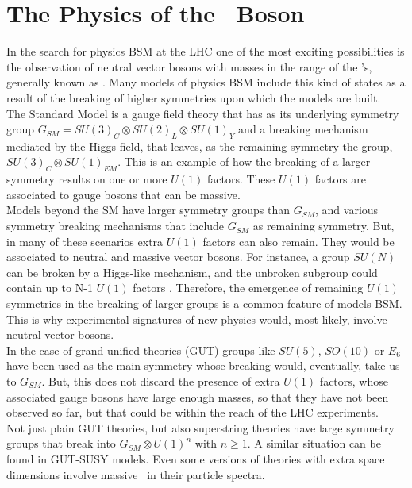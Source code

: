 \chapter[The Physics of The \Zprime~Boson]{The Physics of the \Zprime~Boson}
\label{chap:Zp}

\noindent In the search for physics BSM at the LHC one of the most exciting possibilities 
is the observation of neutral vector bosons with masses in the range of 
the \TeV's, generally known as \Zprime. Many models of physics 
BSM include this kind of states as a result of the breaking of higher symmetries upon 
which the models are built. \\

\noindent The Standard Model is a gauge field theory that has as its underlying symmetry 
group $G_{SM} = SU(3)_{C}\otimes SU(2)_{L} \otimes SU(1)_{Y}$ and a breaking mechanism 
mediated by the Higgs field, that leaves, as the remaining symmetry the group,
$SU(3)_{C}\otimes SU(1)_{EM}$. This is an example of how the breaking of a larger symmetry 
results on one or more $U(1)$ factors. These $U(1)$ factors are associated to gauge
bosons that can be massive.\\

\noindent Models beyond the SM have larger symmetry groups than $G_{SM}$, and various symmetry breaking 
mechanisms that include $G_{SM}$ as remaining symmetry. But, in many of these 
scenarios extra $U(1)$ factors can also remain. They would be associated 
to neutral and massive vector bosons. For instance, a group $SU(N)$ can 
be broken by a Higgs-like mechanism, and the unbroken subgroup could contain up to
N-1 $U(1)$ factors \cite{Langacker:2008yv}. Therefore, the emergence of remaining 
$U(1)$ symmetries in the breaking of larger groups is a common feature 
of models BSM. This is why experimental signatures of new physics 
would, most likely, involve neutral vector bosons.\\
% 
\noindent In the case of grand unified theories (GUT) groups like $SU(5)$, $SO(10)$ or $E_{6}$ have been
used as the main symmetry whose breaking would, eventually, take us to $G_{SM}$. But, this
does not discard the presence of extra $U(1)$ factors, whose associated 
gauge bosons have large enough masses, so that they have not 
been observed so far, but that could be within the reach of the LHC 
experiments. \\

\noindent Not just plain GUT theories, but also superstring theories have large symmetry groups 
that break into $G_{SM} \otimes U(1)^{n}$ with $n \geq 1$. A similar situation can be found in 
GUT-SUSY models. Even some versions of theories with extra space dimensions involve
massive \Zprime~in their particle spectra. \\


